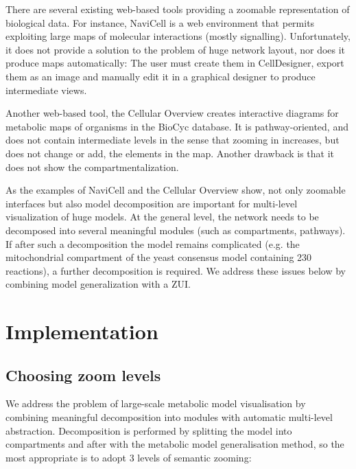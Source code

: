 \documentclass{bmcart}
\begin{document}
There are several existing web-based tools providing a zoomable representation of biological data. For instance, NaviCell\cite{Kuperstein2013} is a web environment that permits exploiting large maps of molecular interactions (mostly signalling). Unfortunately, it does not provide a solution to the problem of huge network layout, nor does it produce  maps automatically: The user must create them in CellDesigner, export them as an image and manually edit it in a graphical designer to produce intermediate views.

Another web-based tool, the Cellular Overview\cite{Latendresse2011} creates interactive diagrams for metabolic maps of organisms in the BioCyc database\cite{Caspi2012}. It is pathway-oriented, and does not contain intermediate levels in the sense that zooming in increases, but does not change or add, the elements in the map. Another drawback is that it does not show the compartmentalization.

As the examples of NaviCell and the Cellular Overview show, not only zoomable interfaces but also model decomposition are important for multi-level visualization of huge models. At the general level, the network needs to be decomposed into several meaningful modules (such as compartments, pathways). If after such a decomposition the model remains complicated (e.g. the mitochondrial compartment of the yeast consensus model\cite{Heavner12} containing 230 reactions), a further decomposition is required. We address these issues below by combining model generalization with a ZUI.


\section*{Implementation}

\subsection*{Choosing zoom levels}
We address the problem of large-scale metabolic model visualisation by combining meaningful decomposition into modules with automatic multi-level abstraction. Decomposition is performed by splitting the model into compartments and after with the metabolic model generalisation method, so the most appropriate is to adopt 3 levels of semantic zooming:
\end{document}
